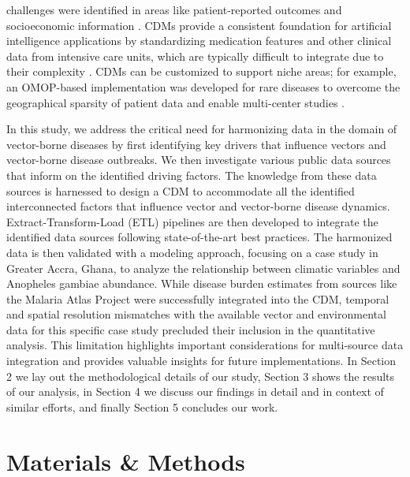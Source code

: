\documentclass{article}
\begin{document}
challenges were identified in areas like patient-reported outcomes and socioeconomic information \citep{2017.HK.FOR}. 
CDMs provide a consistent foundation for artificial intelligence applications by standardizing medication features and 
other clinical data from intensive care units, which are typically difficult to integrate due to their complexity 
\citep{2016.MG.ECD, 2015.FF.CAC}. CDMs can be customized to support niche areas; for example, an OMOP-based implementation 
was developed for rare diseases to overcome the geographical sparsity of patient data and enable multi-center studies 
\citep{2024.NA.HTC, 2015.FF.CAC, 2015.EA.FAU}.
\par
In this study, we address the critical need for harmonizing data in the domain of vector-borne diseases by first identifying 
key drivers that influence vectors and vector-borne disease outbreaks. We then investigate various public data sources that 
inform on the identified driving factors. The knowledge from these data sources is harnessed to design a CDM to accommodate 
all the identified interconnected factors that influence vector and vector-borne disease dynamics. Extract-Transform-Load 
(ETL) pipelines are then developed to integrate the identified data sources following state-of-the-art best practices. 
The harmonized data is then validated with a modeling approach, focusing on a case study in Greater Accra, Ghana, to analyze 
the relationship between climatic variables and Anopheles gambiae abundance. While disease burden estimates from sources like 
the Malaria Atlas Project were successfully integrated into the CDM, temporal and spatial resolution mismatches with the 
available vector and environmental data for this specific case study precluded their inclusion in the quantitative analysis. 
This limitation highlights important considerations for multi-source data integration and provides valuable insights for 
future implementations. In Section 2 we lay out the methodological details of our study, Section 3 shows the results of 
our analysis, in Section 4 we discuss our findings in detail and in context of similar efforts, and finally Section 5 
concludes our work.

\section{Materials \& Methods}
\label{sec:method}
\end{document}
